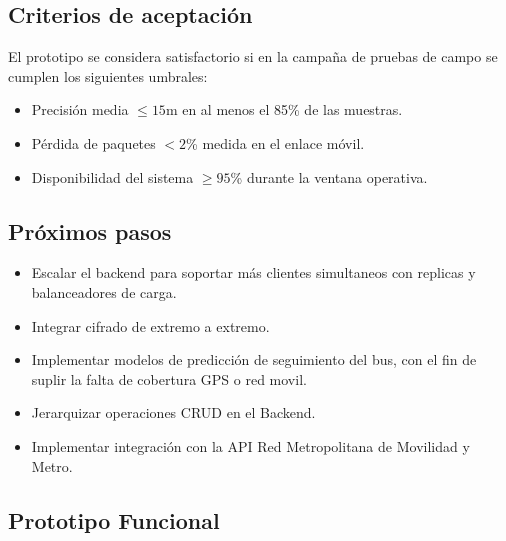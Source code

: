 \documentclass[12pt]{article}
\begin{document}
\subsection{Criterios de aceptación}
El prototipo se considera satisfactorio si en la campaña de pruebas de campo se cumplen los siguientes umbrales:
\begin{itemize}
\item Precisión media $\leq 15$m en al menos el 85\% de las muestras.
\item Pérdida de paquetes $<2$\% medida en el enlace móvil.
\item Disponibilidad del sistema $\geq 95$\% durante la ventana operativa.
\end{itemize}

\subsection{Próximos pasos}
\begin{itemize}
\item Escalar el backend para soportar más clientes simultaneos con replicas y balanceadores de carga.
\item Integrar cifrado de extremo a extremo.
\item Implementar modelos de predicción de seguimiento del bus, con el fin de suplir la falta de cobertura GPS o red movil.
\item Jerarquizar operaciones CRUD en el Backend.
\item Implementar integración con la API Red Metropolitana de Movilidad y Metro.
\end{itemize}
\subsection{Prototipo Funcional}
\end{document}
